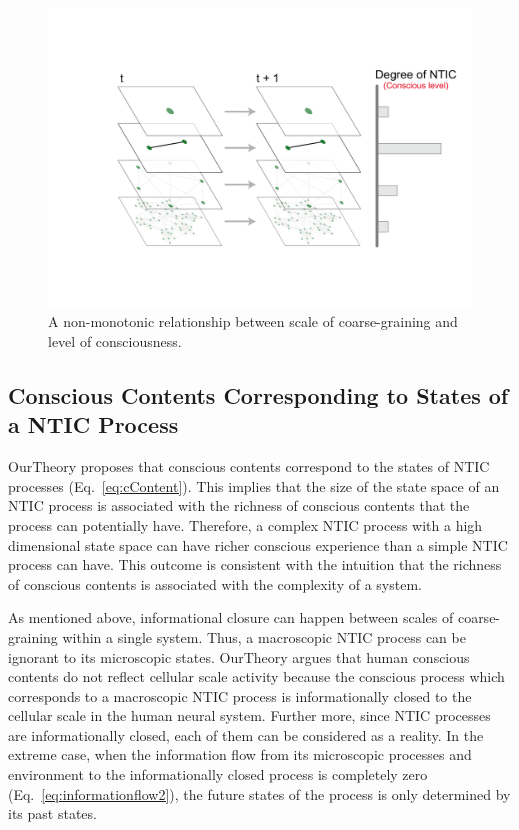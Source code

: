 \documentclass[utf8]{article}
\begin{document}
    		\begin{figure}[H]				
        		\includegraphics[width=\textwidth]{Submission/Frontiers/nonMono.pdf}
        		\caption{A non-monotonic relationship between scale of coarse-graining and level of consciousness.}
        		\label{fig:LevelOfConsciousness}
    		\end{figure}
            
    			
		\subsection{Conscious Contents Corresponding to States of a NTIC Process}\label{sec:cc}
    		\ac{OurTheory} proposes that conscious contents correspond to the states of NTIC processes (Eq.~\ref{eq:cContent}). This implies that the size of the state space of an NTIC process is associated with the richness of conscious contents that the process can potentially have. Therefore, a complex NTIC process with a high dimensional state space can have richer conscious experience than a simple NTIC process can have. This outcome is consistent with the intuition that the richness of conscious contents is associated with the complexity of a system. 
    		
    		As mentioned above, informational closure can happen between scales of coarse-graining within a single system. Thus, a macroscopic NTIC process can be ignorant to its microscopic states. \ac{OurTheory} argues that human conscious contents do not reflect cellular scale activity because the conscious process which corresponds to a macroscopic NTIC process is informationally closed to the cellular scale in the human neural system. Further more, since NTIC processes are informationally closed, each of them can be considered as a reality. In the extreme case, when the information flow from its microscopic processes and environment to the informationally closed process is completely zero (Eq.~\ref{eq:informationflow2}), the future states of the process is only determined by its past states. 
    		
\end{document}

